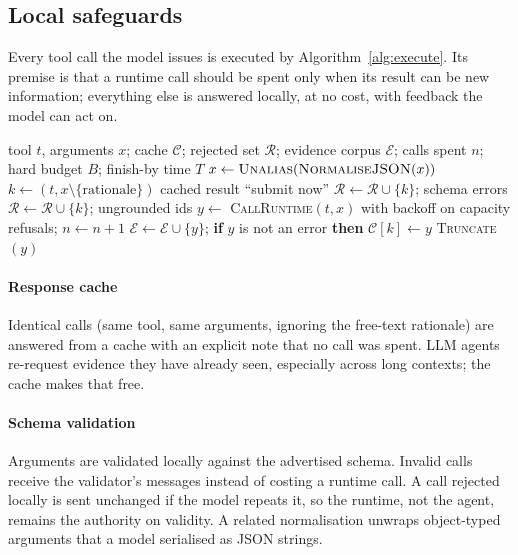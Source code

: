 \subsection{Local safeguards}
\label{sec:safeguards}
Every tool call the model issues is executed by Algorithm~\ref{alg:execute}. Its premise is that a runtime call
should be spent only when its result can be new information; everything else is answered locally, at no cost,
with feedback the model can act on.

\begin{algorithm}[t]
\caption{Execute a model-issued tool call}
\label{alg:execute}
\small
\begin{algorithmic}[1]
\Require tool $t$, arguments $x$; cache $\mathcal C$; rejected set $\mathcal R$; evidence corpus $\mathcal E$; calls spent $n$; hard budget $B$; finish-by time $T$
\State $x \gets \textsc{Unalias}(\textsc{NormaliseJSON}(x))$ \Comment{\S\ref{sec:alias}}
\State $k \gets (t, x \setminus \{\text{rationale}\})$
 \Return cached result \EndIf
{} \Return ``submit now'' \EndIf
{}
   $\mathcal R\gets\mathcal R\cup\{k\}$; \Return schema errors \EndIf
   $\mathcal R\gets\mathcal R\cup\{k\}$; \Return ungrounded ids \EndIf
\EndIf
\State $y\gets$ \textsc{CallRuntime}$(t,x)$ with backoff on capacity refusals; $n\gets n+1$
\State $\mathcal E\gets\mathcal E\cup\{y\}$; \textbf{if} $y$ is not an error \textbf{then} $\mathcal C[k]\gets y$
\State \Return \textsc{Truncate}$(y)$
\end{algorithmic}
\end{algorithm}

\paragraph{Response cache} Identical calls (same tool, same arguments, ignoring the free-text rationale) are
answered from a cache with an explicit note that no call was spent. LLM agents re-request evidence they have
already seen, especially across long contexts; the cache makes that free.

\paragraph{Schema validation} Arguments are validated locally against the advertised schema. Invalid calls
receive the validator's messages instead of costing a runtime call. A call rejected locally is sent unchanged
if the model repeats it, so the runtime, not the agent, remains the authority on validity. A related
normalisation unwraps object-typed arguments that a model serialised as JSON strings.

